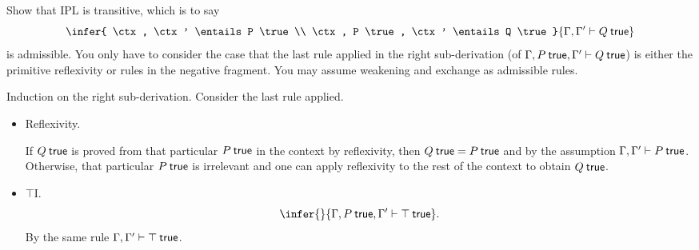 \documentclass[12pt]{article}
\newcommand{\cut}[1]{}
\newcommand{\showsol}[1]{\color{FireBrick}#1\normalcolor}%
\newcommand{\showsol}[1]{\cut{#1}}%
\newenvironment{sol}{\trivlist \item[\hskip \labelsep{\bf
Solution:}]}{\endtrivlist}
\begin{document}
\begin{task}
  Show that IPL is transitive, which is to say
  \[
    \infer{
      \ctx, \ctx' \entails P \true
      \\
      \ctx, P \true, \ctx' \entails Q \true
    }{
      \ctx, \ctx' \entails Q \true
    }
  \]
  is admissible.
  You only have to consider the case that the last rule applied in the right sub-derivation
  (of $\ctx, P \true, \ctx' \entails Q \true$)
  is either the primitive reflexivity or rules in the negative fragment.
  You may assume weakening and exchange as admissible rules.
\end{task}
\showsol{
\begin{sol}
  Induction on the right sub-derivation. Consider the last rule applied.
  \begin{itemize}
    \item Reflexivity.

      If $Q \true$ is proved from that particular $P \true$ in the context by reflexivity,
      then $Q \true = P \true$ and by the assumption $\ctx, \ctx' \entails P \true$.
      Otherwise, that particular $P \true$ is irrelevant
      and one can apply reflexivity to the rest of the context to obtain $Q \true$.

    \item $\top$I.
      \[
        \infer{
        }{
          \ctx, P \true, \ctx' \entails \top \true
        }.
      \]
      By the same rule $\ctx, \ctx' \entails \top \true$.
    

\end{itemize}
\end{sol}}
\end{document}
